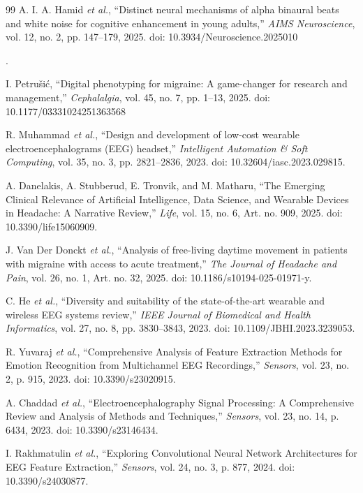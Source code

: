 \documentclass[12pt, a4paper]{report}
\begin{document}
\begin{thebibliography}{99}
A. I. A. Hamid \textit{et al.}, ``Distinct neural mechanisms of alpha binaural beats and white noise for cognitive enhancement in young adults,'' \textit{AIMS Neuroscience}, vol. 12, no. 2, pp. 147--179, 2025. doi: 10.3934/Neuroscience.2025010
        
        
        
        .

I. Petru\v{s}i\'c, ``Digital phenotyping for migraine: A game-changer for research and management,'' \textit{Cephalalgia}, vol. 45, no. 7, pp. 1--13, 2025. doi: 10.1177/03331024251363568
        
R. Muhammad \textit{et al.}, ``Design and development of low-cost wearable electroencephalograms (EEG) headset,'' \textit{Intelligent Automation \& Soft Computing}, vol. 35, no. 3, pp. 2821--2836, 2023. doi: 10.32604/iasc.2023.029815.

A. Danelakis, A. Stubberud, E. Tronvik, and M. Matharu, ``The Emerging Clinical Relevance of Artificial Intelligence, Data Science, and Wearable Devices in Headache: A Narrative Review,'' \textit{Life}, vol. 15, no. 6, Art. no. 909, 2025. doi: 10.3390/life15060909.

J. Van Der Donckt \textit{et al.}, ``Analysis of free-living daytime movement in patients with migraine with access to acute treatment,'' \textit{The Journal of Headache and Pain}, vol. 26, no. 1, Art. no. 32, 2025. doi: 10.1186/s10194-025-01971-y.

C. He \textit{et al.}, ``Diversity and suitability of the state-of-the-art wearable and wireless EEG systems review,'' \textit{IEEE Journal of Biomedical and Health Informatics}, vol. 27, no. 8, pp. 3830--3843, 2023. doi: 10.1109/JBHI.2023.3239053.

R. Yuvaraj \textit{et al.}, ``Comprehensive Analysis of Feature Extraction Methods for Emotion Recognition from Multichannel EEG Recordings,'' \textit{Sensors}, vol. 23, no. 2, p. 915, 2023. doi: 10.3390/s23020915.

A. Chaddad \textit{et al.}, ``Electroencephalography Signal Processing: A Comprehensive Review and Analysis of Methods and Techniques,'' \textit{Sensors}, vol. 23, no. 14, p. 6434, 2023. doi: 10.3390/s23146434.

I. Rakhmatulin \textit{et al.}, ``Exploring Convolutional Neural Network Architectures for EEG Feature Extraction,'' \textit{Sensors}, vol. 24, no. 3, p. 877, 2024. doi: 10.3390/s24030877.



\end{thebibliography}
\end{document}
